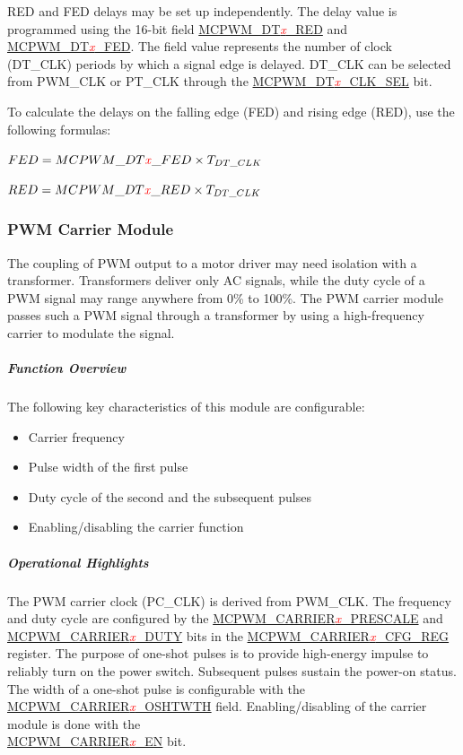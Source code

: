 \documentclass[main\_\_EN.tex]{subfiles}
\begin{document}
RED and FED delays may be set up independently. The delay value is programmed using the 16-bit field \hyperref[fielddesc:MCPWMDT0RED]{MCPWM\_DT\textcolor{red}{\it{x}}\_RED} and \hyperref[fielddesc:MCPWMDT0FED]{MCPWM\_DT\textcolor{red}{\it{x}}\_FED}. The field value represents the number of clock (DT\_CLK) periods by which a signal edge is delayed. DT\_CLK can be selected from PWM\_CLK or PT\_CLK through the \hyperref[fielddesc:MCPWMDT0CLKSEL]{MCPWM\_DT\textcolor{red}{\it{x}}\_CLK\_SEL} bit.  

To calculate the delays on the falling edge (FED) and rising edge (RED), use the following formulas:
\begin{center}
    \item $FED = MCPWM\_DT\textcolor{red}{\it{x}}\_FED \times T_{DT\_CLK}$
    \item $RED = MCPWM\_DT\textcolor{red}{\it{x}}\_RED \times T_{DT\_CLK}$
\end{center}

\clearpage

\subsubsection{PWM Carrier Module}
The coupling of PWM output to a motor driver may need isolation with a transformer. Transformers deliver only AC signals, while the duty cycle of a PWM signal may range anywhere from 0\% to 100\%. The PWM carrier module passes such a PWM signal through a transformer by using a high-frequency carrier to modulate the signal.

\subparagraph{Function Overview}
The following key characteristics of this module are configurable:
\begin{itemize}
    \item Carrier frequency
    \item Pulse width of the first pulse
    \item Duty cycle of the second and the subsequent pulses
    \item Enabling/disabling the carrier function
\end{itemize}

\subparagraph{Operational Highlights}
The PWM carrier clock (PC\_CLK) is derived from PWM\_CLK. The frequency and duty cycle are configured by the \hyperref[fielddesc:MCPWMCARRIER1PRESCALE]{MCPWM\_CARRIER\textcolor{red}{\it{x}}\_PRESCALE} and \hyperref[fielddesc:MCPWMCARRIER1DUTY]{MCPWM\_CARRIER\textcolor{red}{\it{x}}\_DUTY} bits in the \hyperref[regdesc:MCPWMCARRIER0CFGREG]{MCPWM\_CARRIER\textcolor{red}{\it{x}}\_CFG\_REG} register. The purpose of one-shot pulses is to provide high-energy impulse to reliably turn on the power switch. Subsequent pulses sustain the power-on status. The width of a one-shot pulse is configurable with the\\ \hyperref[fielddesc:MCPWMCARRIER1OSHTWTH]{MCPWM\_CARRIER\textcolor{red}{\it{x}}\_OSHTWTH} field. Enabling/disabling of the carrier module is done with the\\ \hyperref[fielddesc:MCPWMCARRIER0EN]{MCPWM\_CARRIER\textcolor{red}{\it{x}}\_EN} bit.
\end{document}
